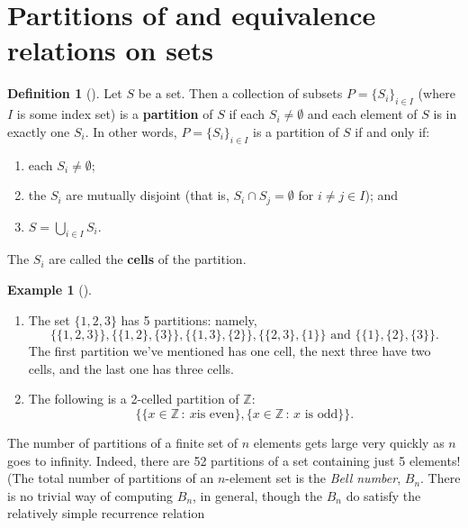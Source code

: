 \documentclass[10pt,openany,oneside]{book}
\newcommand{\terminology}[1]{\textbf{#1}}
\theoremstyle{plain}
\theoremstyle{definition}
\newtheorem{definition}[theorem]{Definition}
\theoremstyle{definition}
\theoremstyle{definition}
\newtheorem{example}[theorem]{Example}
\theoremstyle{definition}
\numberwithin{equation}{section}
\def\Z{\mathbb{Z}}
\begin{document}
\section[{Partitions of and equivalence relations on sets}]{Partitions of and equivalence relations on sets}\label{section-22}
\begin{definition}[{}]\label{definition-54}
Let \(S\) be a set. Then a collection of subsets \(P=\{S_i\}_{i\in I}\) (where \(I\) is some index set) is a \terminology{partition} of \(S\) if each \(S_i \neq \emptyset\) and each element of \(S\) is in exactly one \(S_i\). In other words, \(P=\{S_i\}_{i\in I}\) is a partition of \(S\) if and only if: \leavevmode%
\begin{enumerate}
\item\hypertarget{li-383}{}each \(S_i\neq \emptyset\);%
\item\hypertarget{li-384}{}the \(S_i\) are mutually disjoint (that is, \(S_i\cap S_j =
\emptyset\) for \(i\neq j \in I\)); and%
\item\hypertarget{li-385}{}\(S=\bigcup_{i\in I}S_i\).%
\end{enumerate}
%
\par
The \(S_i\) are called the \terminology{cells} of the partition.%
\end{definition}
\begin{example}[]\label{example-62}
\leavevmode%
\begin{enumerate}
\item\hypertarget{li-386}{}The set \(\{1,2,3\}\) has 5 partitions: namely,%
\begin{equation*}
\{\{1,2,3\}\},\{\{1,2\},\{3\}\}, \{\{1,3\},\{2\}\},\{\{2,3\},\{1\}\} \text{ and }  \{\{1\},\{2\},\{3\}\}.
\end{equation*}
The first partition we've mentioned has one cell, the next three have two cells, and the last one has three cells.%
\item\hypertarget{li-387}{}The following is a 2-celled partition of \(\Z\):%
\begin{equation*}
\{\{x\in \Z\,:\ x \text{
is even} \},\{x\in \Z\,:\, x\text{ is odd} \}\}.
\end{equation*}
%
\end{enumerate}
%
\end{example}
The number of partitions of a finite set of \(n\) elements gets large very quickly as \(n\) goes to infinity. Indeed, there are 52 partitions of a set containing just 5 elements! (The total number of partitions of an \(n\)-element set is the \emph{Bell number}, \(B_n\). There is no trivial way of computing \(B_n\), in general, though the \(B_n\) do satisfy the relatively simple recurrence relation%
\end{document}
